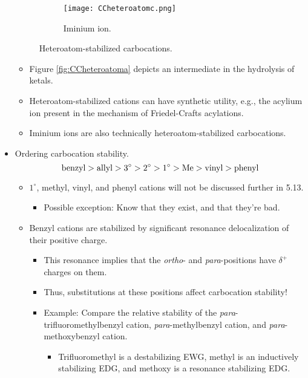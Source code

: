 \documentclass[../notes.tex]{subfiles}
\begin{document}
\begin{itemize}
\begin{figure}[h!]
\begin{subfigure}[b]{0.33\linewidth}
            \centering
            \texttt{[image: CCheteroatomc.png]}
            \caption{Iminium ion.}
            \label{fig:CCheteroatomc}
        \end{subfigure}
        \caption{Heteroatom-stabilized carbocations.}
        \label{fig:CCheteroatom}
    \end{figure}
    \begin{itemize}
        \item Figure \ref{fig:CCheteroatoma} depicts an intermediate in the hydrolysis of ketals.
        \item Heteroatom-stabilized cations can have synthetic utility, e.g., the acylium ion present in the mechanism of Friedel-Crafts acylations.
        \item Iminium ions are also technically heteroatom-stabilized carbocations.
    \end{itemize}
    \item Ordering carbocation stability.
    \begin{equation*}
        \text{benzyl} > \text{allyl} > 3^\circ > 2^\circ > 1^\circ > \ce{Me} > \text{vinyl} > \text{phenyl}
    \end{equation*}
    \begin{itemize}
        \item $1^\circ$, methyl, vinyl, and phenyl cations will not be discussed further in 5.13.
        \begin{itemize}
            \item Possible exception: Know that they exist, and that they're bad.
        \end{itemize}
        \item Benzyl cations are stabilized by significant resonance delocalization of their positive charge.
        \begin{itemize}
            \item This resonance implies that the \emph{ortho}- and \emph{para}-positions have $\delta^+$ charges on them.
            \item Thus, substitutions at these positions affect carbocation stability!
            \item Example: Compare the relative stability of the \emph{para}-trifluoromethylbenzyl cation, \emph{para}-methylbenzyl cation, and \emph{para}-methoxybenzyl cation.
            \begin{itemize}
                \item Trifluoromethyl is a destabilizing EWG, methyl is an inductively stabilizing EDG, and methoxy is a resonance stabilizing EDG.

\end{itemize}
\end{itemize}
\end{itemize}
\end{itemize}
\end{document}
